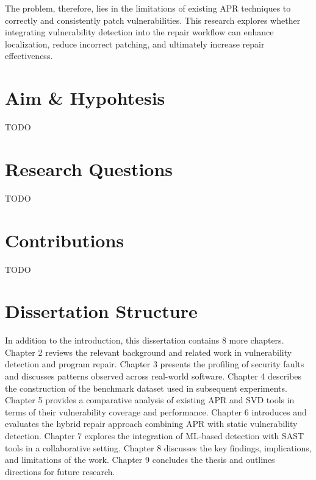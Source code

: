 
The problem, therefore, lies in the limitations of existing APR techniques to correctly and consistently patch vulnerabilities. This research explores whether integrating vulnerability detection into the repair workflow can enhance localization, reduce incorrect patching, and ultimately increase repair effectiveness.

\section{Aim \& Hypohtesis} \label{sec:ae4}

TODO

\section{Research Questions} \label{sec:ae4}

TODO

\section{Contributions} \label{sec:ae4}

TODO

\section{Dissertation Structure} \label{sec:struct}

In addition to the introduction, this dissertation contains 8 more chapters. Chapter 2 reviews the relevant background and related work in vulnerability detection and program repair. Chapter 3 presents the profiling of security faults and discusses patterns observed across real-world software. Chapter 4 describes the construction of the benchmark dataset used in subsequent experiments. Chapter 5 provides a comparative analysis of existing APR and SVD tools in terms of their vulnerability coverage and performance. Chapter 6 introduces and evaluates the hybrid repair approach combining APR with static vulnerability detection. Chapter 7 explores the integration of ML-based detection with SAST tools in a collaborative setting. Chapter 8 discusses the key findings, implications, and limitations of the work. Chapter 9 concludes the thesis and outlines directions for future research.